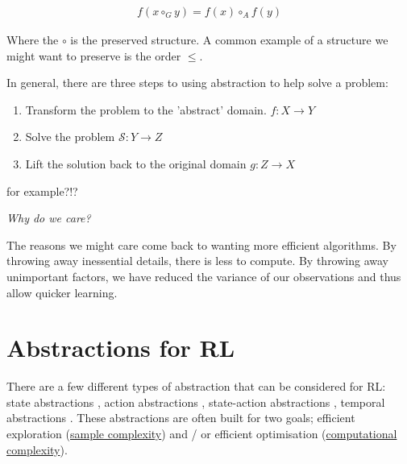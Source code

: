 
\begin{align*}
f(x \circ_G y) = f(x) \circ_A f(y)
\end{align*}

Where the $\circ$ is the preserved structure. \footnotemark[19]
A common example of a structure we might want to preserve is the order $\le$.


In general, there are three steps to using abstraction to help solve a problem:

\begin{enumerate}
\tightlist
  \item Transform the problem to the 'abstract' domain. $f: X\to Y$
  \item Solve the problem $\mathcal S: Y \to Z$
  \item Lift the solution back to the original domain  $g:Z \to X$
\end{enumerate}

{\color{red}for example?!?}

\begin{displayquote}
 \textit{Why do we care?}
\end{displayquote}

The reasons we might care come back to wanting more efficient algorithms.
By throwing away inessential details, there is less to compute.
By throwing away unimportant factors, we have reduced the variance of our
observations and thus allow quicker learning.

%

\section{Abstractions for RL}


There are a few different types of abstraction that can be considered for RL:
state abstractions \cite{Anand2019, Littman2006,Haarnoja,Cuccu2018,Zhonga,Vezzani2019,Abel2018,Duan2018,Abel2017,Silver2016a},
action abstractions \cite{Chandak2019,Bester2019,Tennenholtz2019,Nagabandi2019}, state-action abstractions \cite{Dayan1993,Barreto2017}, temporal abstractions \cite{Christodoulou2019, Rafati,Mankowitz2018,Harutyunyan2017,Fruit2017,Riemer2018,Bacon2018,Achiam2018,Pham2019,Konidaris2018,Haarnoja,Sutton1999,Fruit2017a,Bacon2016a,Jinnai2018,Nachum2018}.
These abstractions are often built for two goals; efficient exploration
(\href{https://en.wikipedia.org/wiki/Sample_complexity}{sample complexity})
and / or efficient optimisation (\href{https://en.wikipedia.org/wiki/Computational_complexity_theory}{computational complexity}).

